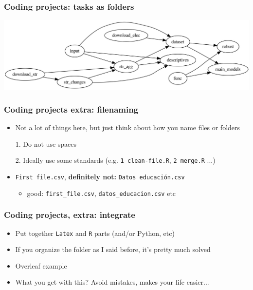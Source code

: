 \documentclass[aspectratio=43]{beamer}
\begin{document}
\begin{frame}
\frametitle{Coding projects: tasks as folders}
\centering

\includegraphics[width = \textwidth]{img/workflow_vox_streets}

\end{frame}

\begin{frame}
\frametitle{Coding projects extra: filenaming}
\centering

\begin{itemize}
  \item Not a lot of things here, but just think about how you name files or folders
  \item[1.] Do not use spaces
  \item[2.] Ideally use some standards (e.g. \texttt{1\_clean-file.R}, \texttt{2\_merge.R} ...)
  \item \textbf{{\color{red}{DON'T:}}} \texttt{First file.csv}, \textbf{definitely not:} \texttt{Datos educación.csv}
  \begin{itemize}
    \item good: \texttt{first\_file.csv}, \texttt{datos\_educacion.csv} etc
  \end{itemize}
\end{itemize}

\end{frame}

\begin{frame}
\frametitle{Coding projects, extra: integrate}
\centering

\begin{itemize}
  \item Put together \texttt{Latex} and \texttt{R} parts (and/or Python, etc)
  \item If you organize the folder as I said before, it's pretty much solved
  \item Overleaf example
  \item What you get with this? Avoid mistakes, makes your life easier...
\end{itemize}

\end{frame}
\end{document}
